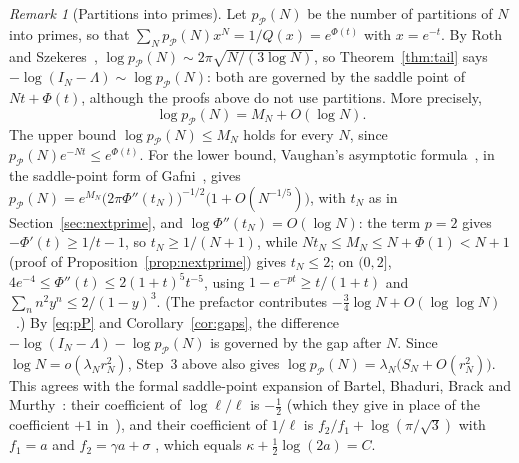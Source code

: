 \documentclass[11pt]{article}
\theoremstyle{remark}
\newtheorem{remark}[theorem]{Remark}
\newcommand{\Prm}{\mathcal{P}}
\begin{document}
\begin{remark}[Partitions into primes]\label{rem:partitions}
Let $p_{\Prm}(N)$ be the number of partitions of $N$ into primes, so
that $\sum_Np_{\Prm}(N)x^N=1/Q(x)=e^{\Phi(t)}$ with $x=e^{-t}$. By Roth
and Szekeres~\cite{RothSzekeres},
$\log p_{\Prm}(N)\sim2\pi\sqrt{N/(3\log N)}$, so Theorem~\ref{thm:tail}
says $-\log(I_N-\Lambda)\sim\log p_{\Prm}(N)$: both are governed by the
saddle point of $Nt+\Phi(t)$, although the proofs above do not use
partitions. More precisely,
\begin{equation}\label{eq:pP}
  \log p_{\Prm}(N)=M_N+O(\log N).
\end{equation}
The upper bound $\log p_{\Prm}(N)\le M_N$ holds for every $N$, since
$p_{\Prm}(N)e^{-Nt}\le e^{\Phi(t)}$. For the lower bound, Vaughan's
asymptotic formula~\cite{Vaughan2008}, in the saddle-point form of
Gafni~\cite[Theorem~1.3 with $k=1$]{Gafni2021}, gives
$p_{\Prm}(N)=e^{M_N}\bigl(2\pi\Phi''(t_N)\bigr)^{-1/2}\bigl(1+O(N^{-1/5})\bigr)$,
with $t_N$ as in Section~\ref{sec:nextprime}, and
$\log\Phi''(t_N)=O(\log N)$: the term $p=2$ gives
$-\Phi'(t)\ge1/t-1$, so $t_N\ge1/(N+1)$, while $Nt_N\le M_N\le N+\Phi(1)<N+1$ (proof of Proposition~\ref{prop:nextprime}) gives
$t_N\le2$; on $(0,2]$,
$4e^{-4}\le\Phi''(t)\le2(1+t)^5t^{-5}$, using
$1-e^{-pt}\ge t/(1+t)$ and $\sum_nn^2y^n\le2/(1-y)^3$. (The prefactor
contributes $-\tfrac34\log N+O(\log\log N)$~\cite[(1.5)]{Gafni2021}.)
By \eqref{eq:pP} and Corollary~\ref{cor:gaps}, the difference
$-\log(I_N-\Lambda)-\log p_{\Prm}(N)$ is governed by the gap after $N$.
Since $\log N=o(\lambda_Nr_N^2)$, Step~3 above also gives
$\log p_{\Prm}(N)=\lambda_N\bigl(S_N+O(r_N^2)\bigr)$. This agrees with
the formal saddle-point expansion of Bartel, Bhaduri, Brack and
Murthy~\cite[(43)]{BBBM2017}: their coefficient of $\log\ell/\ell$ is
$-\tfrac12$ (which they give in place of the coefficient $+1$
in~\cite{Vaughan2008}), and their coefficient of $1/\ell$ is
$f_2/f_1+\log(\pi/\sqrt3)$ with $f_1=a$ and $f_2=\gamma a+\sigma$
\cite[(23)]{BBBM2017}, which equals $\kappa+\tfrac12\log(2a)=C$.
\end{remark}
\end{document}
